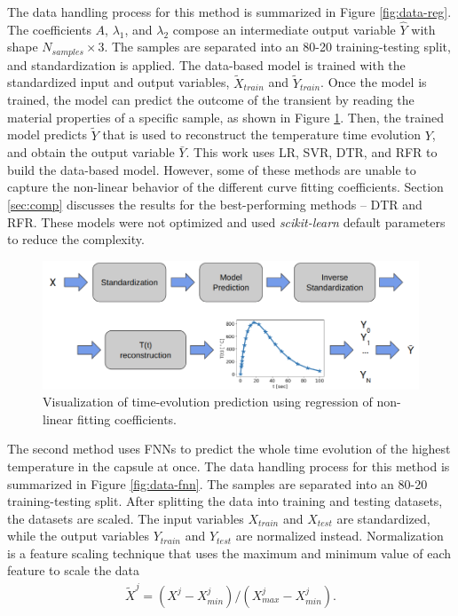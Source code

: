 The data handling process for this method is summarized in Figure \ref{fig:data-reg}.
The coefficients $A$, $\lambda_1$, and $\lambda_2$ compose an intermediate output variable $\hat{Y}$ with shape $N_{samples} \times 3$.
The samples are separated into an 80-20 training-testing split, and standardization is applied.
The data-based model is trained with the standardized input and output variables, $\tilde{X}_{train}$ and $\tilde{Y}_{train}$.
Once the model is trained, the model can predict the outcome of the transient by reading the material properties of a specific sample, as shown in Figure \ref{fig:data-reg1}.
Then, the trained model predicts $\tilde{Y}$ that is used to reconstruct the temperature time evolution $Y$, and obtain the output variable $\bar{Y}$.
This work uses \gls*{LR}, \gls*{SVR}, \gls*{DTR}, and \gls*{RFR} to build the data-based model.
However, some of these methods are unable to capture the non-linear behavior of the different curve fitting coefficients.
Section \ref{sec:comp} discusses the results for the best-performing methods -- \gls*{DTR} and \gls*{RFR}.
These models were not optimized and used \textit{scikit-learn} default parameters to reduce the complexity.

\begin{figure}[htbp!] %
  \centering
  \includegraphics[width=0.7\linewidth]{figures/data-prediction-tEvol-nlf}
  \caption{Visualization of time-evolution prediction using regression of non-linear fitting coefficients.}
  \label{fig:data-reg1}
\end{figure}

The second method uses FNNs to predict the whole time evolution of the highest temperature in the capsule at once.
The data handling process for this method is summarized in Figure \ref{fig:data-fnn}.
The samples are separated into an 80-20 training-testing split.
After splitting the data into training and testing datasets, the datasets are scaled.
The input variables $X_{train}$ and $X_{test}$ are standardized, while the output variables $Y_{train}$ and $Y_{test}$ are normalized instead.
Normalization is a feature scaling technique that uses the maximum and minimum value of each feature to scale the data
\begin{align}
\tilde{X}^j = (X^j - X_{min}^j) / (X_{max}^j - X_{min}^j).
\end{align}

